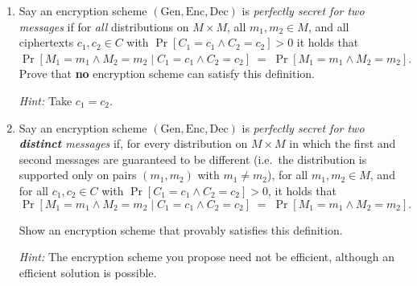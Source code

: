 \begin{enumerate}
	\item[(a)] Say an encryption scheme $(\text{Gen},\text{Enc},\text{Dec})$ is \emph{perfectly secret for two messages} if for \emph{all} distributions on $M\times M$, all $m_1,m_2\in M$, and all ciphertexts $c_1,c_2\in C$ with $\Pr[C_1=c_1 \wedge C_2=c_2]>0$ it holds that $\Pr[M_1=m_1 \wedge M_2=m_2 \mid C_1=c_1 \wedge C_2=c_2] \;=\; \Pr[M_1=m_1 \wedge M_2=m_2].$
	Prove that \textbf{no} encryption scheme can satisfy this definition.  
	
	\textit{Hint:} Take $c_1=c_2$.
	
	\item[(b)] Say an encryption scheme \((\text{Gen},\text{Enc},\text{Dec})\) is \emph{perfectly secret for two \textbf{distinct} messages} if, for every distribution on \(M \times M\) in which the first and second messages are guaranteed to be different (i.e.\ the distribution is supported only on pairs \((m_1,m_2)\) with \(m_1 \neq m_2\)), for all \(m_1,m_2 \in M\), and for all \(c_1,c_2 \in C\) with \(\Pr[C_1 = c_1 \wedge C_2 = c_2] > 0\), it holds that
	\[
	\Pr[M_1 = m_1 \wedge M_2 = m_2 \mid C_1 = c_1 \wedge C_2 = c_2]
	\;=\;
	\Pr[M_1 = m_1 \wedge M_2 = m_2].
	\]
	
	Show an encryption scheme that provably satisfies this definition.  
	
	\textit{Hint:} The encryption scheme you propose need not be efficient, although an efficient solution is possible.
	
\end{enumerate}

